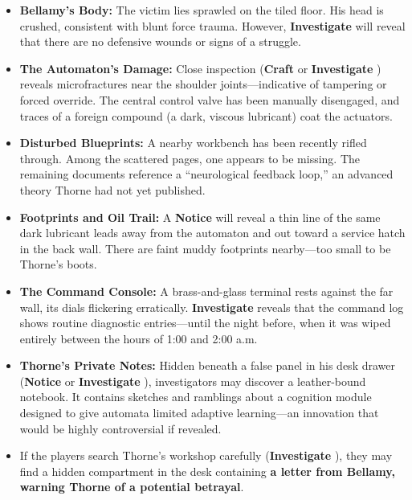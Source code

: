 \begin{itemize}\raggedright
    \item \textbf{Bellamy’s Body:} The victim lies sprawled on the tiled floor. His head is crushed, consistent with blunt force trauma. However, \textbf{Investigate}  will reveal that there are no defensive wounds or signs of a struggle.
    
    \item \textbf{The Automaton’s Damage:} Close inspection (\textbf{Craft}  or \textbf{Investigate} ) reveals microfractures near the shoulder joints—indicative of tampering or forced override. The central control valve has been manually disengaged, and traces of a foreign compound (a dark, viscous lubricant) coat the actuators. %

    \item \textbf{Disturbed Blueprints:} A nearby workbench has been recently rifled through. Among the scattered pages, one appears to be missing. The remaining documents reference a “neurological feedback loop,” an advanced theory Thorne had not yet published.

    \item \textbf{Footprints and Oil Trail:} A \textbf{Notice}  will reveal a thin line of the same dark lubricant leads away from the automaton and out toward a service hatch in the back wall. There are faint muddy footprints nearby—too small to be Thorne’s boots.

    \item \textbf{The Command Console:} A brass-and-glass terminal rests against the far wall, its dials flickering erratically. \textbf{Investigate}  reveals that the command log shows routine diagnostic entries—until the night before, when it was wiped entirely between the hours of 1:00 and 2:00 a.m.

    \item \textbf{Thorne’s Private Notes:} Hidden beneath a false panel in his desk drawer (\textbf{Notice}  or \textbf{Investigate} ), investigators may discover a leather-bound notebook. It contains sketches and ramblings about a cognition module designed to give automata limited adaptive learning—an innovation that would be highly controversial if revealed.
    
    \item If the players search Thorne’s workshop carefully (\textbf{Investigate} ), they may find a hidden compartment in the desk containing \textbf{a letter from Bellamy, warning Thorne of a potential betrayal}.
\end{itemize}

